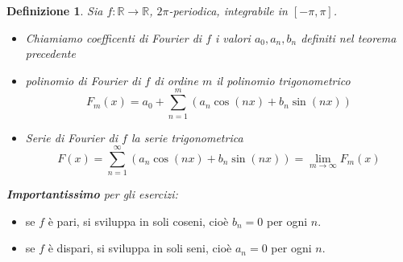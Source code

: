 \documentclass{scrreprt}
\newtheorem{defn}{Definizione}
\newenvironment{definition}{\begin{mdframed}[backgroundcolor=Ivory2]\begin{defn}}{\end{defn}\end{mdframed}}
\begin{document}
\begin{definition}
	Sia $f:\mathbb{R}\to\mathbb{R}$, $2\pi$-periodica, integrabile in $\left[-\pi,\pi\right]$.
	\begin{itemize}
		\item Chiamiamo coefficenti di Fourier di $f$ i valori $a_0, a_n, b_n$ definiti nel teorema precedente
		\item polinomio di Fourier di $f$ di ordine $m$ il polinomio trigonometrico
			\begin{equation}
				F_m(x) = a_0 + \sum_{n=1}^m \left(a_n \cos(nx) + b_n \sin(nx)\right)
			\end{equation}
		\item Serie di Fourier di $f$ la serie trigonometrica
			\begin{equation}
				F(x) = \sum_{n=1}^\infty \left(a_n \cos(nx) + b_n \sin(nx)\right) = \lim_{m\to\infty} F_m(x)
			\end{equation}
	\end{itemize}
\end{definition}

\emph{\textbf{Importantissimo} per gli esercizi:}
\begin{itemize}
	\item se $f$ è pari, si sviluppa in soli coseni, cioè $b_n=0$ per ogni $n$.
	\item se $f$ è dispari, si sviluppa in soli seni, cioè $a_n=0$ per ogni $n$.
\end{itemize}
\end{document}

